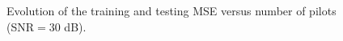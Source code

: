 \documentclass{article}
\begin{document}
\begin{figure}[!t]
\caption{Evolution of the training and testing MSE versus number of pilots (SNR$=30$ dB).}\label{full1fig}
\end{figure}
\end{document}
